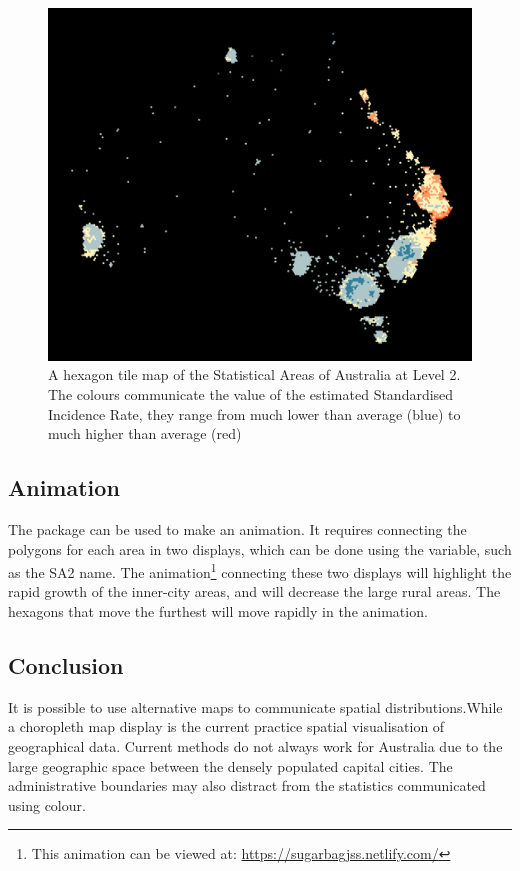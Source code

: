 \documentclass[
]{jss}
\begin{document}
\begin{figure}

{\centering \includegraphics[width=0.6\linewidth]{figures/aus_melanoma_p_hex} 

}

\caption[A hexagon tile map of the Statistical Areas of Australia at Level 2]{A hexagon tile map of the Statistical Areas of Australia at Level 2. The colours communicate the value of the estimated Standardised Incidence Rate, they range from much lower than average (blue) to much higher than average (red)}\label{fig:melanoma-hex}
\end{figure}

\hypertarget{animation}{%
\subsection{Animation}\label{animation}}

The  package can be used to make an animation. It
requires connecting the polygons for each area in two displays, which
can be done using the  variable, such as the SA2 name. The
animation\footnote{This animation can be viewed at:
  \url{https://sugarbagjss.netlify.com/}} connecting these two displays
will highlight the rapid growth of the inner-city areas, and will
decrease the large rural areas. The hexagons that move the furthest will
move rapidly in the animation.

\hypertarget{conclusion}{%
\subsection{Conclusion}\label{conclusion}}

It is possible to use alternative maps to communicate spatial
distributions.While a choropleth map display is the current practice
spatial visualisation of geographical data. Current methods do not
always work for Australia due to the large geographic space between the
densely populated capital cities. The administrative boundaries may also
distract from the statistics communicated using colour.
\end{document}
